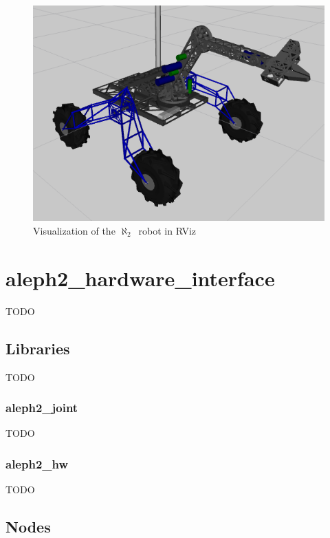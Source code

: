 \documentclass[english,inz,shortabstract]{iithesis}
\newcommand{\rovername}{$\aleph_2$\ }
\begin{document}
	\begin{figure}[H]
		\centering
		\captionsetup{margin=2cm}
		\includegraphics[width=\textwidth]{img/description_rviz.png}
		\caption{Visualization of the \rovername robot in RViz}
		\label{fig:description_rviz}
	\end{figure}


\section{aleph2\_hardware\_interface}
TODO

\subsection{Libraries}
	TODO

	\subsubsection{aleph2\_joint}
	TODO

	\subsubsection{aleph2\_hw}
	TODO

\subsection{Nodes}
\end{document}
